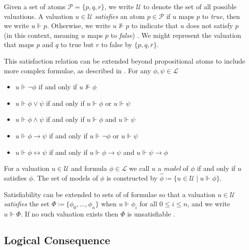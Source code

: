 Given a set of atoms $\mathcal{P} = \{p,q,r\}$, we write $\mathcal{U}$ to denote the set of all possible valuations. A valuation $u \in \mathcal{U}$ \textit{satisfies} an atom $p \in \mathcal{P}$ if $u$ maps $p$ to \textit{true}, then we write $u \Vdash p$. Otherwise, we write $u \nVdash p$ to indicate that $u$ does not satisfy $p$ (in this context, meaning $u$ maps $p$ to \textit{false}) \cite[p. 16]{Ben1993Mathematical}. We might represent the valuation that maps $p$ and $q$ to true but $r$ to false by $\{p,q,\overline{r}\}$.

This satisfaction relation can be extended beyond propositional atoms to include more complex formulae, as described in . For any $\phi, \psi \in \mathcal{L}$ 

\begin{itemize}
  \item $u \Vdash \neg \phi$ if and only if $u \nVdash \phi$
  \item $u \Vdash \phi \vee \psi$ if and only if $u \Vdash \phi$ or $u \Vdash \psi$
  \item $u \Vdash \phi \wedge \psi$ if and only if $u \Vdash \phi$ and $u \Vdash \psi$
  \item $u \Vdash \phi \rightarrow \psi$ if and only if $u \Vdash \neg \phi$ or $u \Vdash \psi$
  \item $u \Vdash \phi \leftrightarrow \psi$ if and only if $u \Vdash \phi \rightarrow \psi$ and $u \Vdash \psi \rightarrow \phi$
\end{itemize}

\begin{definition} 
  \label{definition:model}
  For a valuation $u \in \mathcal{U}$ and formula $\phi \in \mathcal{L}$ we call $u$ a \textit{model} of $\phi$ if and only if $u$ satisfies $\phi$. The set of models of $\phi$ is constructed by $\hat{\phi} \coloneqq \{u \in \mathcal{U} \mid u \Vdash \phi \}$.
\end{definition}

Satisfiability can be extended to sets of of formulae so that a valuation $u \in \mathcal{U}$ \textit{satisfies} the set $\Phi \coloneqq \{\phi_0, \ldots, \phi_n \}$ when $u \Vdash \phi_i$ for all $0 \leq i \leq n$, and we write $u \Vdash \Phi$. If no such valuation exists then $\Phi$ is unsatisfiable \cite[p. 31]{Ben1993Mathematical}. 

\subsection{Logical Consequence}
\label{subsection:logical-consequence}

